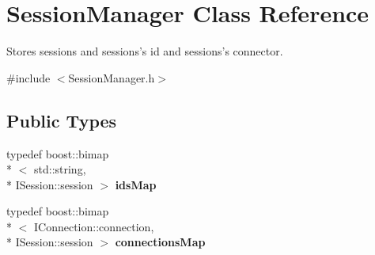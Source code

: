 \hypertarget{class_session_manager}{\section{Session\-Manager Class Reference}
\label{class_session_manager}
}


Stores sessions and sessions's id and sessions's connector.  




{\ttfamily \#include $<$Session\-Manager.\-h$>$}

\subsection*{Public Types}
\begin{DoxyCompactItemize}
\item 
\hypertarget{class_session_manager_a319f29dc0dcee4ef9b78867de08b4628}{typedef boost\-::bimap\\*
$<$ std\-::string, \\*
I\-Session\-::session $>$ {\bfseries ids\-Map}}\label{class_session_manager_a319f29dc0dcee4ef9b78867de08b4628}

\item 
\hypertarget{class_session_manager_a599af1bb9fed83ad9dddd9d213ecdc9e}{typedef boost\-::bimap\\*
$<$ I\-Connection\-::connection, \\*
I\-Session\-::session $>$ {\bfseries connections\-Map}}\label{class_session_manager_a599af1bb9fed83ad9dddd9d213ecdc9e}

\end{DoxyCompactItemize}
